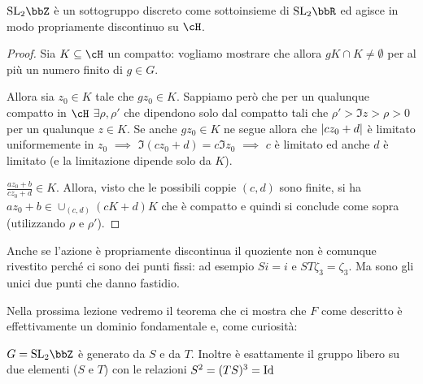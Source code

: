 \begin{lemma}
  $\SL_2 \bbZ$ è un sottogruppo discreto come sottoinsieme di $\SL_2 \bbR$
  ed agisce in modo propriamente discontinuo su $\cH$.
\end{lemma}
\begin{proof}
  Sia $K \subseteq \cH$ un compatto: vogliamo mostrare che allora
  $gK \cap K \neq \emptyset$ per al più un numero finito di $g \in G$.

  Allora sia $z_0 \in K$ tale che $g z_0 \in K$. Sappiamo però che per
  un qualunque compatto in $\cH$ $\exists \rho, \rho'$ che dipendono
  solo dal compatto tali che $\rho' > \Im z > \rho > 0$ per un qualunque
  $z \in K$. Se anche $g z_0 \in K$ ne segue allora che $\left| cz_0 + d \right|$
  è limitato uniformemente in $z_0$ $\implies$
  $\Im (cz_0 + d) = c \Im z_0$ $\implies$ $c$ è limitato ed anche $d$ è
  limitato (e la limitazione dipende solo da $K$).

  $\frac{a z_0 + b}{c z_0 + d} \in K$. Allora, visto che le possibili
  coppie $(c, d)$ sono finite, si ha
  $a z_0 + b \in \cup_{(c, d)} (cK + d)K$ che è compatto e quindi si
  conclude come sopra (utilizzando $\rho$ e $\rho'$).
\end{proof}

Anche se l'azione è propriamente discontinua il quoziente non è comunque
rivestito perché ci sono dei punti fissi: ad esempio $Si = i$ e $ST
\zeta_3 = \zeta_3$. Ma sono gli unici due punti che danno fastidio.


Nella prossima lezione vedremo il teorema che ci mostra che $F$ come
descritto è effettivamente un dominio fondamentale e, come curiosità:
\begin{teorema}
  $G = \SL_2 \bbZ$ è generato da $S$ e da $T$. Inoltre è esattamente il
  gruppo libero su due elementi ($S$ e $T$) con le relazioni
  $S^2 = (TS)^3 = \text{Id}$
\end{teorema}

